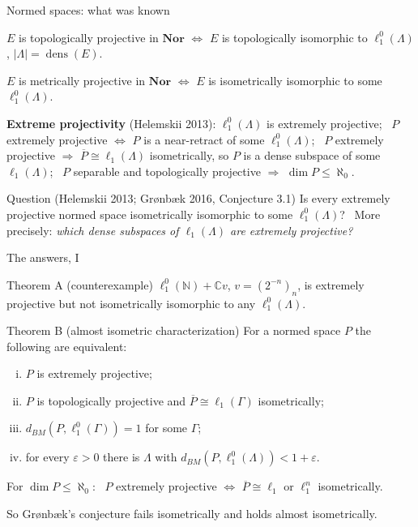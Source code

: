 \documentclass[10pt,aspectratio=169]{beamer}
\newcommand{\Nor}{\mathbf{Nor}}
\newcommand{\lo}[1]{\ell_1^0(#1)}
\newcommand{\ellone}[1]{\ell_1(#1)}
\newcommand{\dens}{\operatorname{dens}}
\newcommand{\BM}{d_{BM}}
\newcommand{\NN}{\mathbb N}
\newcommand{\CC}{\mathbb C}
\begin{document}
\begin{frame}{Normed spaces: what was known}
  \begin{theorem}[Gr{\o}nb{\ae}k 2016]
    $E$ is topologically projective in $\Nor$ $\iff$ $E$ is topologically
    isomorphic to $\lo\Lambda$, $|\Lambda|=\dens(E)$.
  \end{theorem}
  \begin{theorem}[Helemskii 2013]
    $E$ is metrically projective in $\Nor$ $\iff$ $E$ is isometrically
    isomorphic to some $\lo\Lambda$.
  \end{theorem}
  \textbf{Extreme projectivity} (Helemskii 2013):
  $\lo\Lambda$ is extremely projective; \
  $P$ extremely projective $\iff$ $P$ is a near-retract of some $\lo\Lambda$; \
  $P$ extremely projective $\Rightarrow$ $\overline P\cong\ellone\Lambda$
  isometrically, so $P$ is a dense subspace of some $\ellone\Lambda$; \
  $P$ separable and topologically projective $\Rightarrow$ $\dim P\le\aleph_0$.
  \begin{alertblock}{Question (Helemskii 2013; Gr{\o}nb{\ae}k 2016, Conjecture 3.1)}
    Is every extremely projective normed space isometrically isomorphic to some
    $\lo\Lambda$? \ More precisely: \emph{which dense subspaces of $\ellone\Lambda$
    are extremely projective?}
  \end{alertblock}
\end{frame}

\begin{frame}{The answers, I}
  \begin{block}{Theorem A (counterexample)}
    $\lo\NN+\CC v$, $v=(2^{-n})_n$, is extremely projective but not
    isometrically isomorphic to any $\lo\Lambda$.
  \end{block}
  \begin{block}{Theorem B (almost isometric characterization)}
    For a normed space $P$ the following are equivalent:
    \begin{enumerate}[(i)]
      \item $P$ is extremely projective;
      \item $P$ is topologically projective and $\overline P\cong\ellone\Gamma$ isometrically;
      \item $\BM(P,\lo\Gamma)=1$ for some $\Gamma$;
      \item for every $\varepsilon>0$ there is $\Lambda$ with $\BM(P,\lo\Lambda)<1+\varepsilon$.
    \end{enumerate}
    For $\dim P\le\aleph_0$: \ $P$ extremely projective $\iff$
    $\overline P\cong\ell_1$ or $\ell_1^n$ isometrically.
  \end{block}
  So Gr{\o}nb{\ae}k's conjecture fails isometrically and holds almost
  isometrically.
\end{frame}
\end{document}
